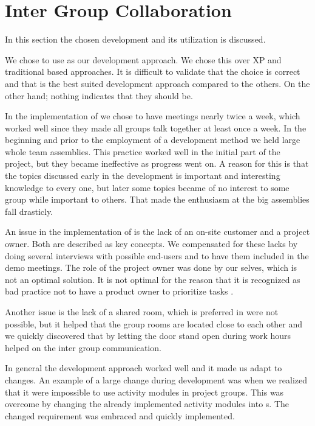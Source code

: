 \section{Inter Group Collaboration}
\label{sec:intergroup}
In this section the chosen development and its utilization is discussed.

We chose to use \sos{} as our development approach.
We chose this over XP and traditional based approaches.
It is difficult to validate that the choice is correct and that \sos{} is the best suited development approach compared to the others.
On the other hand; nothing indicates that they should be. 


In the implementation of \sos{} we chose to have \sos{} meetings nearly twice a week, which worked well since  they made all groups talk together at least once a week. 
In the beginning and prior to the employment of a development method we held large whole team assemblies. 
This practice worked well in the initial part of the project, but they became ineffective as progress went on. 
A reason for this is that the topics discussed early in the development is important and interesting knowledge to every one, but later some topics became of no interest to some group while important to others.
That made the enthusiasm at the big assemblies fall drasticly. 


An issue in the implementation of \sos{} is the lack of an on-site customer and a project owner. 
Both are described as key concepts. 
We compensated for these lacks by doing several interviews with possible end-users and to have them included in the demo meetings. 
The role of the project owner was done by our selves, which is not an optimal solution. 
It is not optimal for the reason that it is recognized as bad \scrum{} practice not to have a product owner to prioritize tasks \cite[P. 128]{larman}. 


Another issue is the lack of a shared room, which is preferred in \sos{} were not possible, but it helped that the group rooms are located close to each other and we quickly discovered that by letting the door stand open during work hours helped on the inter group communication. 

In general the development approach worked well and it made us adapt to changes. 
An example of a large change during development was when we realized that it were impossible to use activity modules in project groups. 
This was overcome by changing the already implemented activity modules into \block[]s. 
The changed requirement was embraced and quickly implemented. 